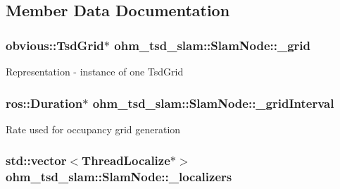 \subsection{Member Data Documentation}
\hypertarget{classohm__tsd__slam_1_1SlamNode_ae781a4fa4945e764019bf372cd6ac5ab}{
\subsubsection[{\-\_\-grid}]{\setlength{\rightskip}{0pt plus 5cm}obvious\-::\-Tsd\-Grid$\ast$ ohm\-\_\-tsd\-\_\-slam\-::\-Slam\-Node\-::\-\_\-grid\hspace{0.3cm}{\ttfamily [private]}}}\label{classohm__tsd__slam_1_1SlamNode_ae781a4fa4945e764019bf372cd6ac5ab}
Representation -\/ instance of one Tsd\-Grid \hypertarget{classohm__tsd__slam_1_1SlamNode_aca637ee8387c2414902516f0a4e32b79}{
\subsubsection[{\-\_\-grid\-Interval}]{\setlength{\rightskip}{0pt plus 5cm}ros\-::\-Duration$\ast$ ohm\-\_\-tsd\-\_\-slam\-::\-Slam\-Node\-::\-\_\-grid\-Interval\hspace{0.3cm}{\ttfamily [private]}}}\label{classohm__tsd__slam_1_1SlamNode_aca637ee8387c2414902516f0a4e32b79}
Rate used for occupancy grid generation \hypertarget{classohm__tsd__slam_1_1SlamNode_a94818e8716a1ee8d83071e2bf8fb2604}{
\subsubsection[{\-\_\-localizers}]{\setlength{\rightskip}{0pt plus 5cm}std\-::vector$<$Thread\-Localize$\ast$$>$ ohm\-\_\-tsd\-\_\-slam\-::\-Slam\-Node\-::\-\_\-localizers\hspace{0.3cm}{\ttfamily [private]}}}\label{classohm__tsd__slam_1_1SlamNode_a94818e8716a1ee8d83071e2bf8fb2604}
